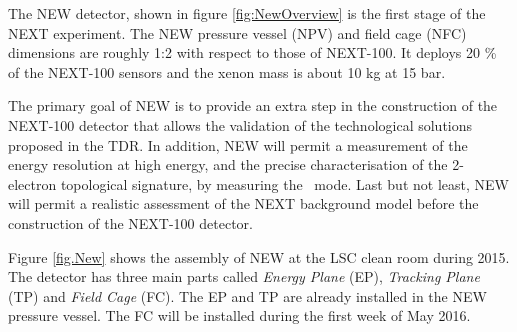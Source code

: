 The NEW detector, shown in figure \ref{fig:NewOverview} is the first stage of the NEXT experiment. The NEW pressure vessel (NPV) and field cage
(NFC) dimensions are roughly 1:2 with respect to those of NEXT-100. It deploys 20 \% of the NEXT-100 sensors and the xenon mass is about 10 kg at 15 bar. 

The primary goal of NEW is to provide an extra step in the construction of the NEXT-100 detector that allows the validation of the technological solutions proposed in the TDR. In addition, NEW will permit a measurement of the energy resolution at high energy, and the precise characterisation of the 2-electron topological signature, by measuring the \bbtnu\ mode. Last but not least, NEW will permit a realistic assessment of the NEXT background model before the construction of the NEXT-100 detector. 

Figure \ref{fig.New} shows the assembly of NEW at the LSC clean room during 2015. The detector has three main parts called {\em Energy Plane} (EP), {\em Tracking Plane} (TP) and {\em Field Cage} (FC). The EP and TP are already installed in the NEW pressure vessel. The FC will be installed during the first week of May 2016.

%
%
%
%
%


